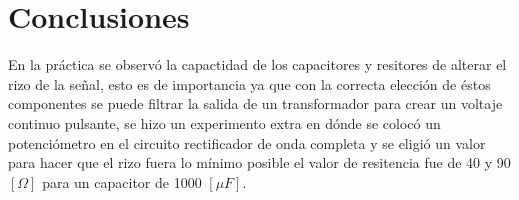 \documentclass{article}
\begin{document}








\section{Conclusiones}

En la práctica se observó la capactidad de los capacitores y resitores de alterar el rizo de la señal, esto es de importancia ya que con la correcta elección de éstos componentes se puede filtrar la salida de un transformador para crear un voltaje continuo pulsante, se hizo un experimento extra en dónde se colocó un potenciómetro en el circuito rectificador de onda completa  y se eligió un valor para hacer que el rizo fuera lo mínimo posible el valor de resitencia fue de 40 y 90 $[\Omega]$ para un capacitor de 1000 $[\mu F]$.





\end{document}
